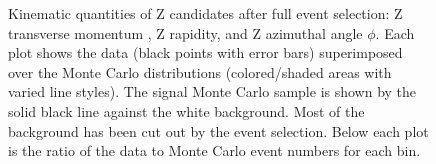 
 \begin{figure}[htb]
  \begin{center}
  \end{center}
  \caption[\fixspacing Kinematic quantities of Z candidates after full selection]{
    \fixspacing Kinematic quantities of Z candidates after full event selection: 
     Z transverse momentum \pt, 
     Z rapidity, and 
     Z azimuthal angle $\phi$.
    Each plot shows the data (black points with error bars) superimposed over the Monte Carlo 
    distributions (colored/shaded areas with varied line styles).  
    The signal Monte Carlo sample is shown by the solid black line against the white background.  
    Most of the background has been cut out by the event selection.  
    Below each plot is the ratio of the data to Monte Carlo event numbers for each bin.  
  }
  \label{fig:Zquantities}
 \end{figure}
